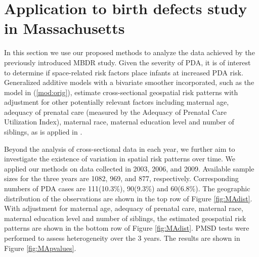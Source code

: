 	\section{Application to birth defects study in Massachusetts}
	
	In this section we use our proposed methods to analyze the data achieved by the previously introduced MBDR study. Given the severity of PDA, it is of interest to determine if space-related risk factors place infants at increased PDA risk. Generalized additive models with a bivariate smoother incorporated, such as the model in (\ref{mod:orig}), estimate cross-sectional geospatial risk patterns with adjustment for other potentially relevant factors including maternal age, adequacy of prenatal care (measured by the Adequacy of Prenatal Care Utilization Index), maternal race, maternal education level and number of siblings, as is applied in  \cite{girguis2016maternal}. 
	
	Beyond the analysis of cross-sectional data in each year, we further aim to investigate the existence of variation in spatial risk patterns over time. We applied our methods on data collected in 2003, 2006, and 2009. Available sample sizes for the three years are 1082, 969, and 877, respectively. Corresponding numbers of PDA cases are 111(10.3\%), 90(9.3\%) and 60(6.8\%). The geographic distribution of the observations are shown in the top row of Figure \ref{fig:MAdist}. With adjustment for maternal age, adequacy of prenatal care, maternal race, maternal education level and number of siblings, the estimated geospatial risk patterns are shown in the bottom row of Figure \ref{fig:MAdist}. PMSD tests were performed to assess heterogeneity over the 3 years. The results are shown in Figure \ref{fig:MApvalues}. 
	
